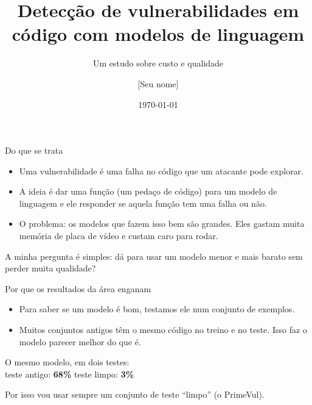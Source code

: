 \documentclass[aspectratio=169,11pt]{beamer}
\title{Detecção de vulnerabilidades em código com modelos de linguagem}
\subtitle{Um estudo sobre custo e qualidade}
\author{[Seu nome]}
\institute{Mestrado em Ciência da Computação — PPGCC/UFMA}
\date{\today}
\begin{document}
\maketitle
{}

\begin{frame}{Do que se trata}
  \begin{itemize}
    \item Uma vulnerabilidade é uma falha no código que um atacante pode explorar.
    \item A ideia é dar uma função (um pedaço de código) para um modelo de linguagem
          e ele responder se aquela função tem uma falha ou não.
    \item O problema: os modelos que fazem isso bem são grandes. Eles gastam muita
          memória de placa de vídeo e custam caro para rodar.
  \end{itemize}
  \vspace{1em}
  A minha pergunta é simples: dá para usar um modelo menor e mais barato
  sem perder muita qualidade?
\end{frame}

\begin{frame}{Por que os resultados da área enganam}
  \begin{itemize}
    \item Para saber se um modelo é bom, testamos ele num conjunto de exemplos.
    \item Muitos conjuntos antigos têm o mesmo código no treino e no teste.
          Isso faz o modelo parecer melhor do que é.
  \end{itemize}
  \vspace{1.5em}
  \begin{center}
    O mesmo modelo, em dois testes:\\[1em]
    {\Large teste antigo: \textbf{68\%} \qquad teste limpo: \textbf{3\%}}
  \end{center}
  \vspace{1.5em}
  Por isso vou usar sempre um conjunto de teste ``limpo'' (o PrimeVul).
\end{frame}
\end{document}
